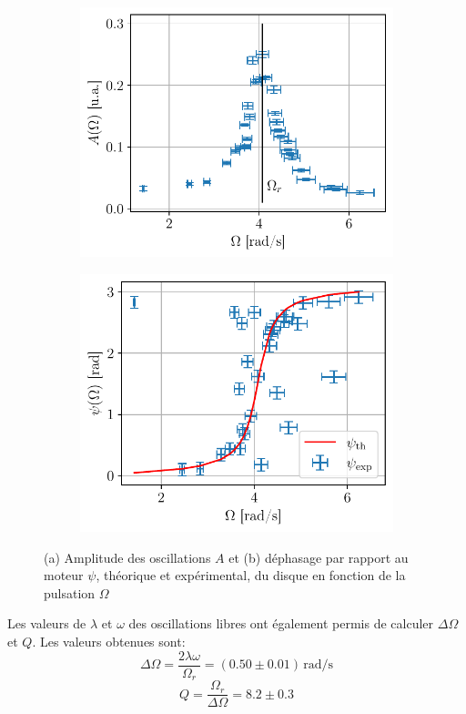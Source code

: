 \begin{figure}[h]
    \centering
    \begin{subfigure}{0.48\linewidth}
        \centering
        \includegraphics[width=\linewidth]{figures/resonance_A.pdf}
        \caption{}
        \label{fig:res_A}
    \end{subfigure}
    \begin{subfigure}{0.48\linewidth}
        \centering
        \includegraphics[width=\linewidth]{figures/resonance_psi.pdf}
        \caption{}
        \label{fig:res_psi}
    \end{subfigure}
    \caption{(a) Amplitude des oscillations $A$ et (b) déphasage par rapport au moteur $\psi$, théorique et expérimental, du disque en fonction de la pulsation $\Omega$}
    \label{fig:resonance}
\end{figure}

Les valeurs de $\lambda$ et $\omega$ des oscillations libres ont également permis de calculer $\Delta \Omega$ et $Q$. Les valeurs obtenues sont:
\[
    \Delta \Omega = \frac{2 \lambda \omega}{\Omega_r} = (0.50\pm0.01) \, \si{\radian\per\second}
\]
\[
    Q = \frac{\Omega_r}{\Delta\Omega} = 8.2\pm0.3
\]

